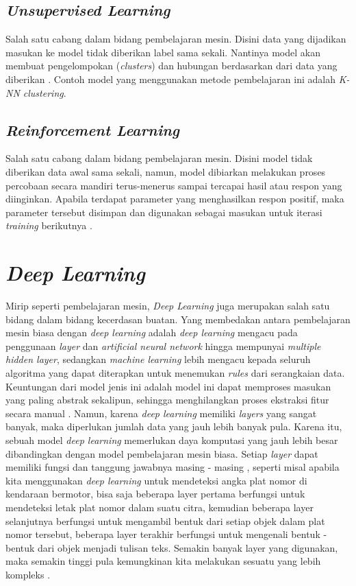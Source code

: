 \subsection{\textit{Unsupervised Learning}}
Salah satu cabang dalam bidang pembelajaran mesin. Disini data yang dijadikan masukan ke model tidak diberikan 
label sama sekali. Nantinya model akan membuat pengelompokan (\textit{clusters}) dan hubungan berdasarkan dari 
data yang diberikan \cite{mit_ml_expl}. Contoh model yang menggunakan metode pembelajaran ini adalah 
\textit{K-NN clustering}.

\subsection{\textit{Reinforcement Learning}}
Salah satu cabang dalam bidang pembelajaran mesin. Disini model tidak diberikan data awal sama sekali, 
namun, model dibiarkan melakukan proses percobaan secara mandiri terus-menerus sampai tercapai hasil atau 
respon yang diinginkan. Apabila terdapat parameter yang menghasilkan respon positif, maka parameter tersebut 
disimpan dan digunakan sebagai masukan untuk iterasi \textit{training} berikutnya \cite{mit_ml_expl}.

\section{\textit{Deep Learning}}

Mirip seperti pembelajaran mesin, \textit{Deep Learning} juga merupakan salah satu bidang dalam bidang 
kecerdasan buatan. Yang membedakan antara pembelajaran mesin biasa dengan \textit{deep learning} adalah 
\textit{deep learning} mengacu pada penggunaan \textit{layer} dan \textit{artificial neural network} hingga
mempunyai \textit{multiple hidden layer}, sedangkan \textit{machine learning} lebih mengacu kepada seluruh 
algoritma yang dapat diterapkan untuk menemukan \textit{rules} dari serangkaian data. 
Keuntungan dari model jenis ini adalah model ini dapat memproses masukan yang paling 
abstrak sekalipun, sehingga menghilangkan proses ekstraksi fitur secara manual \cite{mathwork_deeplearning}. 
Namun, karena \textit{deep learning} memiliki \textit{layers} yang sangat banyak, maka diperlukan jumlah data 
yang jauh lebih banyak pula. Karena itu, sebuah model \textit{deep learning} memerlukan daya komputasi 
yang jauh lebih besar dibandingkan dengan model pembelajaran mesin biasa. Setiap \textit{layer} dapat 
memiliki fungsi dan tanggung jawabnya masing - masing \cite{mit_ml_expl}, seperti misal apabila kita 
menggunakan \textit{deep learning} untuk mendeteksi angka plat nomor di kendaraan bermotor, bisa saja beberapa 
layer pertama berfungsi untuk mendeteksi letak plat nomor dalam suatu citra, kemudian beberapa layer 
selanjutnya berfungsi untuk mengambil bentuk dari setiap objek dalam plat nomor tersebut, beberapa layer 
terakhir berfungsi untuk mengenali bentuk - bentuk dari objek menjadi tulisan teks. Semakin banyak layer yang 
digunakan, maka semakin tinggi pula kemungkinan kita melakukan sesuatu yang lebih kompleks \cite{mit_ml_expl}.

